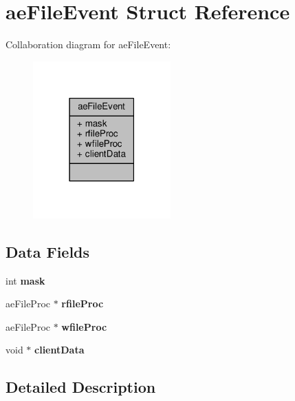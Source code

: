 \hypertarget{structaeFileEvent}{}\section{ae\+File\+Event Struct Reference}
\label{structaeFileEvent}


Collaboration diagram for ae\+File\+Event\+:\nopagebreak
\begin{figure}[H]
\begin{center}
\leavevmode
\includegraphics[width=150pt]{structaeFileEvent__coll__graph}
\end{center}
\end{figure}
\subsection*{Data Fields}
\begin{DoxyCompactItemize}
\item 
\mbox{\label{structaeFileEvent_ac43aaab34810e8b6bfcc5a2576220959}} 
int {\bfseries mask}
\item 
\mbox{\label{structaeFileEvent_ae39bf42ed5c4cac998ee5c9fc4ee0069}} 
ae\+File\+Proc $\ast$ {\bfseries rfile\+Proc}
\item 
\mbox{\label{structaeFileEvent_a48ede39c4bcd4c41f2687efac2a05152}} 
ae\+File\+Proc $\ast$ {\bfseries wfile\+Proc}
\item 
\mbox{\label{structaeFileEvent_a001285b3f180bb6e776a97190fe47b7b}} 
void $\ast$ {\bfseries client\+Data}
\end{DoxyCompactItemize}


\subsection{Detailed Description}


